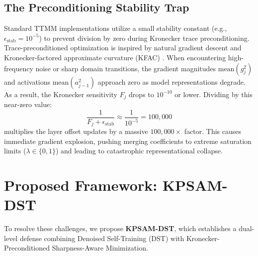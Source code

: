 \documentclass{article}
\theoremstyle{plain}
\theoremstyle{definition}
\theoremstyle{remark}
\begin{document}
\subsection{The Preconditioning Stability Trap}
Standard TTMM implementations utilize a small stability constant (e.g., $\epsilon_{\text{stab}} = 10^{-5}$) to prevent division by zero during Kronecker trace preconditioning. Trace-preconditioned optimization is inspired by natural gradient descent and Kronecker-factored approximate curvature (KFAC) \cite{martens2015optimizing, eschenhagen2023kronecker}. When encountering high-frequency noise or sharp domain transitions, the gradient magnitudes $\text{mean}(g^2_j)$ and activations $\text{mean}(a^2_{j-1})$ approach zero as model representations degrade. As a result, the Kronecker sensitivity $F_j$ drops to $10^{-10}$ or lower. Dividing by this near-zero value:
\begin{equation}
    \frac{1}{F_j + \epsilon_{\text{stab}}} \approx \frac{1}{10^{-5}} = 100,000
\end{equation}
multiplies the layer offset updates by a massive $100,000\times$ factor. This causes immediate gradient explosion, pushing merging coefficients to extreme saturation limits ($\lambda \in \{0, 1\}$) and leading to catastrophic representational collapse.

\section{Proposed Framework: KPSAM-DST}
\label{sec:proposed}
To resolve these challenges, we propose \textbf{KPSAM-DST}, which establishes a dual-level defense combining Denoised Self-Training (DST) with Kronecker-Preconditioned Sharpness-Aware Minimization.
\end{document}
